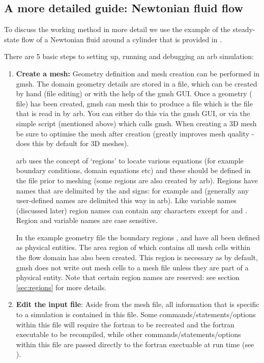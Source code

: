 \subsection{A more detailed guide:  Newtonian fluid flow}

To discuss the working method in more detail we use the example of the steady-state flow of a Newtonian fluid around a cylinder that is provided in .

There are 5 basic steps to setting up, running and debugging an arb simulation:
%
\begin{enumerate}
\item  \textbf{Create a mesh:}  Geometry definition and mesh creation can be performed in gmsh.  The domain geometry details are stored in a  file, which can be created by hand (file editing) or with the help of the gmsh GUI.  Once a geometry ( file) has been created, gmsh can mesh this to produce a  file which is the file that is read in by arb.  You can either do this via the gmsh GUI, or via the simple  script (mentioned above) which calls gmsh.  When creating a 3D mesh be sure to optimise the mesh after creation (greatly improves mesh quality -  does this by default for 3D meshes).

arb uses the concept of `regions' to locate various equations (for example boundary conditions, domain equations etc) and these should be defined in the  file prior to meshing (some regions are also created by arb).  Regions have names that are delimited by the \code{<} and \code{>} signs:  for example  and  (generally any user-defined names are delimited this way in arb).  Like variable names (discussed later) region names can contain any characters except for  and \code{\#}.  Region and variable names are case sensitive.

In the example geometry file the boundary regions ,  and  have all been defined as physical entities.  The area region of  which contains all mesh cells within the flow domain has also been created.  This region is necessary as by default, gmsh does not write out mesh cells to a mesh file unless they are part of a physical entity.  Note that certain region names are reserved: see section \ref{sec:regions} for more details.


\item  \textbf{Edit the  input file}:  Aside from the mesh file, all information that is specific to a simulation is contained in this file.  Some commands/statements/options within this file will require the fortran to be recreated and the fortran executable to be recompiled, while other commands/statements/options within this file are passed directly to the fortran exectuable at run time (see ).


\end{enumerate}
